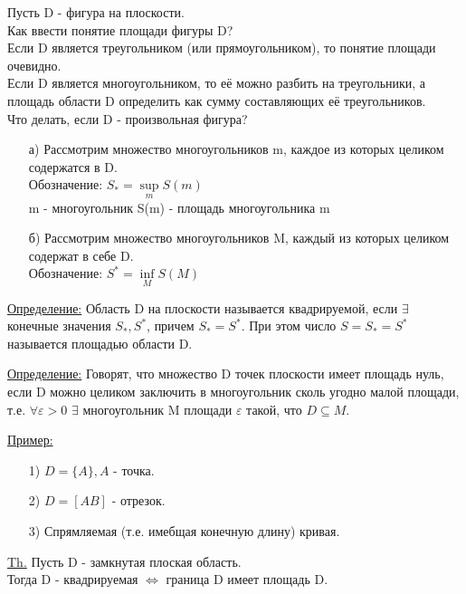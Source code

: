 
Пусть D - фигура на плоскости. \\

Как ввести понятие площади фигуры D? 
\\
Если D является треугольником (или прямоугольником), то понятие площади очевидно. \\

Если D является многоугольником, то её можно разбить на треугольники, а площадь области D определить как сумму составляющих её треугольников. \\

Что делать, если D - произвольная фигура?

\begin{enumerate}
\item[а)] 
Рассмотрим множество многоугольников m, каждое из которых целиком содержатся в D.\\
Обозначение: $S_* = \sup\limits_{m} S(m)$ \\
m - многоугольник
S(m) - площадь многоугольника m 

\item[б)] 
Рассмотрим множество многоугольников M, каждый из которых целиком содержат в себе D. \\
Обозначение: $S^* = \inf\limits_{M} S(M)$
\end{enumerate}

\underline{Определение:} Область D на плоскости называется квадрируемой, если $\exists$ конечные значения $S_*, S^*$, причем $S_* = S^*$. При этом число $S = S_* = S^*$ называется площадью области D.

\underline{Определение:} Говорят, что множество D точек плоскости имеет площадь нуль, если D можно целиком заключить в многоугольник сколь угодно малой площади, т.е. $\forall \varepsilon > 0$ $\exists$ многоугольник M площади $\varepsilon$ такой, что $D \subseteq M$.


\underline{Пример:}
\begin{enumerate}
\item[1)]
$D = \{A\}, A$ - точка.

\item[2)]
$D = [AB]$ - отрезок.

\item[3)] Спрямляемая (т.е. имебщая конечную длину) кривая.
\end{enumerate}


\underline{Th.}
Пусть D - замкнутая плоская область. \\
Тогда D - квадрируемая $\Leftrightarrow$ граница D имеет площадь D. \\

